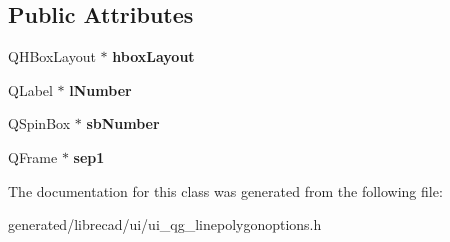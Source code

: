 \subsection*{Public Attributes}
\begin{DoxyCompactItemize}
\item 
\hypertarget{classUi__QG__LinePolygonOptions_ae1f9744272db37b2a16c6af6dbc055f0}{Q\-H\-Box\-Layout $\ast$ {\bfseries hbox\-Layout}}\label{classUi__QG__LinePolygonOptions_ae1f9744272db37b2a16c6af6dbc055f0}

\item 
\hypertarget{classUi__QG__LinePolygonOptions_adb74a6a8a2492dfce700329e429812a8}{Q\-Label $\ast$ {\bfseries l\-Number}}\label{classUi__QG__LinePolygonOptions_adb74a6a8a2492dfce700329e429812a8}

\item 
\hypertarget{classUi__QG__LinePolygonOptions_ab3839d7fe6f76beaff6849bb94659925}{Q\-Spin\-Box $\ast$ {\bfseries sb\-Number}}\label{classUi__QG__LinePolygonOptions_ab3839d7fe6f76beaff6849bb94659925}

\item 
\hypertarget{classUi__QG__LinePolygonOptions_ad81222a7b75ea00b56b12e2d5c8230d6}{Q\-Frame $\ast$ {\bfseries sep1}}\label{classUi__QG__LinePolygonOptions_ad81222a7b75ea00b56b12e2d5c8230d6}

\end{DoxyCompactItemize}


The documentation for this class was generated from the following file\-:\begin{DoxyCompactItemize}
\item 
generated/librecad/ui/ui\-\_\-qg\-\_\-linepolygonoptions.\-h\end{DoxyCompactItemize}
